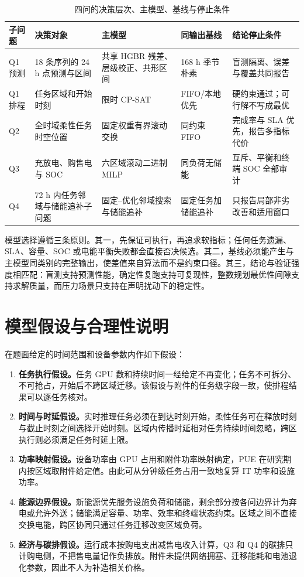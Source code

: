 \begin{table}[H]
  \centering
  \caption{四问的决策层次、主模型、基线与停止条件}
  \label{tab:problem-decomposition}
  \small
  \begin{tabularx}{\textwidth}{p{}p{}p{}p{}X}
    \toprule
    子问题 & 决策对象 & 主模型 & 同输出基线 & 结论停止条件 \\
    \midrule
    Q1 预测 & 18 条序列的 24 h 点预测与区间 & 共享 HGBR 残差、层级校正、共形区间 & 168 h 季节朴素 & 盲测隔离、误差与覆盖共同报告 \\
    Q1 排程 & 任务区域和开始时刻 & 限时 CP-SAT & FIFO/本地优先 & 硬约束通过；可行解不写成最优 \\
    Q2 & 全时域柔性任务时空位置 & 固定权重有界滚动交换 & 同约束 FIFO & 完成率与 SLA 优先，报告多指标代价 \\
    Q3 & 充放电、购售电与 SOC & 六区域滚动二进制 MILP & 同负荷无储能 & 互斥、平衡和终端 SOC 全部审计 \\
    Q4 & 72 h 内任务邻域与储能追补子问题 & 固定--优化邻域搜索与储能追补 & 固定任务加储能追补 & 只报告局部非劣改善和适用窗口 \\
    \bottomrule
  \end{tabularx}
\end{table}

模型选择遵循三条原则。其一，先保证可执行，再追求软指标；任何任务遗漏、SLA、容量、SOC 或电能平衡失败都会直接否决候选。其二，基线必须能产生与主模型同类别的完整输出，使差值来自算法而不是约束口径。其三，结论与验证强度相匹配：盲测支持预测性能，确定性复跑支持可复现性，整数规划最优性间隙支持求解质量，而压力场景只支持在声明扰动下的稳定性。

\section{模型假设与合理性说明}

在题面给定的时间范围和设备参数内作如下假设：

\begin{enumerate}
  \item \textbf{任务执行假设。}任务 GPU 数和持续时间一经给定不再变化；任务不可拆分、不可抢占，开始后不跨区域迁移。该假设与附件的任务级字段一致，使排程结果可以逐任务核对。
  \item \textbf{时间与时延假设。}实时推理任务必须在到达时刻开始，柔性任务可在释放时刻与截止时刻之间选择开始时刻。区域内传播时延相对任务持续时间忽略，跨区执行则必须满足任务时延上限。
  \item \textbf{功率映射假设。}设备功率由 GPU 占用和附件功率映射确定，PUE 在研究期内按区域取附件给定值。由此可从分钟级任务占用一致地复算 IT 功率和设施功率。
  \item \textbf{能源边界假设。}新能源优先服务设施负荷和储能，剩余部分按各问边界计为弃电或允许外送；储能满足容量、功率、效率和终端状态约束。区域之间不直接交换电能，跨区协同只通过任务迁移改变区域负荷。
  \item \textbf{经济与碳排假设。}运行成本按购电支出减售电收入计算，Q3 和 Q4 的碳排只计购电侧，不把售电量记作负排放。附件未提供网络拥塞、迁移能耗和电池退化参数，因此不人为补造相关价格。
\end{enumerate}


